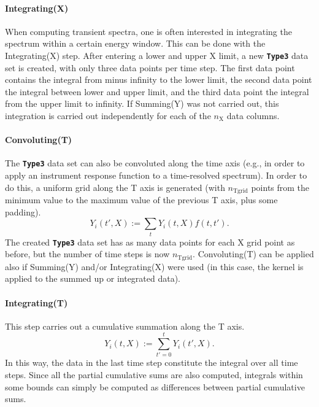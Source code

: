 \documentclass[a4paper,10pt,DIV=15,openany,twoside=false]{scrbook}
\newcommand{\ttt}[1]{\textbf{\texttt{#1}}}
\begin{document}
\paragraph{Integrating(X)}

When computing transient spectra, one is often interested in integrating the spectrum within a certain energy window.
This can be done with the Integrating(X) step.
After entering a lower and upper X limit, a new \ttt{Type3} data set is created, with only three data points per time step.
The first data point contains the integral from minus infinity to the lower limit, the second data point the integral between lower and upper limit, and the third data point the integral from the upper limit to infinity.
If Summing(Y) was not carried out, this integration is carried out independently for each of the $n_\text{X}$ data columns.

\paragraph{Convoluting(T)}

The \ttt{Type3} data set can also be convoluted along the time axis (e.g., in order to apply an instrument response function to a time-resolved spectrum).
In order to do this, a uniform grid along the T axis is generated (with $n_\text{Tgrid}$ points from the minimum value to the maximum value of the previous T axis, plus some padding).
\begin{equation}
  Y_i(t',X):=\sum_{t} Y_i(t,X) f(t,t').
\end{equation}
The created \ttt{Type3} data set has as many data points for each X grid point as before, but the number of time steps is now $n_\text{Tgrid}$.
Convoluting(T) can be applied also if Summing(Y) and/or Integrating(X) were used (in this case, the kernel is applied to the summed up or integrated data).

\paragraph{Integrating(T)}

This step carries out a cumulative summation along the T axis.
\begin{equation}
  Y_i(t,X):=\sum_{t'=0}^t Y_i(t',X).
\end{equation}
In this way, the data in the last time step constitute the integral over all time steps.
Since all the partial cumulative sums are also computed, integrals within some bounds can simply be computed as differences between partial cumulative sums.
\end{document}
